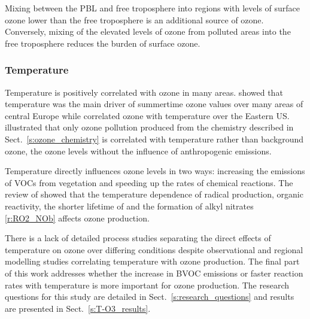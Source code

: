 Mixing between the PBL and free troposphere into regions with levels of surface ozone lower than the free troposphere is an additional source of ozone.
Conversely, mixing of the elevated levels of ozone from polluted areas into the free troposphere reduces the burden of surface ozone.


\subsubsection{Temperature}
Temperature is positively correlated with ozone in many areas.
\citet{Otero:2016} showed that temperature was the main driver of summertime ozone values over many areas of central Europe while \citet{Camalier:2007} correlated ozone with temperature over the Eastern US.
\citet{Sillman:1995a} illustrated that only ozone pollution produced from the chemistry described in Sect.~\ref{s:ozone_chemistry} is correlated with temperature rather than background ozone, the ozone levels without the influence of anthropogenic emissions.

Temperature directly influences ozone levels in two ways: increasing the emissions of VOCs from vegetation and speeding up the rates of chemical reactions.
The review of \citet{Pusede:2015} showed that the temperature dependence of radical production, organic reactivity, the shorter lifetime of  and the formation of alkyl nitrates \eqref{r:RO2_NOb} affects ozone production.

There is a lack of detailed process studies separating the direct effects of temperature on ozone over differing  conditions despite observational and regional modelling studies correlating temperature with ozone production. 
The final part of this work addresses whether the increase in BVOC emissions or faster reaction rates with temperature is more important for ozone production.
The research questions for this study are detailed in Sect.~\ref{s:research_questions} and results are presented in Sect.~\ref{s:T-O3_results}.

